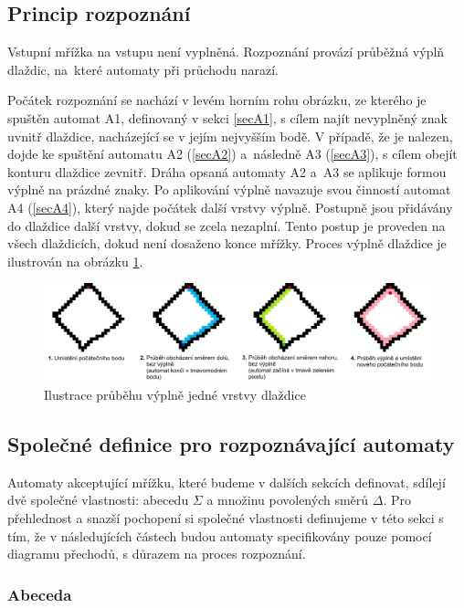\subsection*{Princip rozpoznání}

Vstupní mřížka na vstupu není vyplněná. Rozpoznání provází průběžná výplň dlaždic, na~které automaty při průchodu narazí.

Počátek rozpoznání se nachází v levém horním rohu obrázku, ze kterého je spuštěn automat A1, definovaný v sekci \ref{secA1}, s cílem najít nevyplněný znak uvnitř dlaždice, nacházející se v jejím nejvyšším bodě. V případě, že je nalezen, dojde ke spuštění automatu A2 (\ref{secA2}) a~následně A3 (\ref{secA3}), s cílem obejít konturu dlaždice zevnitř. Dráha opsaná automaty A2 a~A3 se aplikuje formou výplně na prázdné znaky. Po aplikování výplně navazuje svou činností automat A4 (\ref{secA4}), který najde počátek další vrstvy výplně. Postupně jsou přidávány do dlaždice další vrstvy, dokud se zcela nezaplní. Tento postup je proveden na všech dlaždicích, dokud není dosaženo konce mřížky. Proces výplně dlaždice je ilustrován na obrázku \ref{fig:prubehVyplnePOpis}.

\begin{figure}[H]
    \centering
    \includegraphics[width=\textwidth]{obrazky-figures/prubehVyplnePopis.png}
    \caption{Ilustrace průběhu výplně jedné vrstvy dlaždice}
    \label{fig:prubehVyplnePOpis}
\end{figure}

\subsection*{Společné definice pro rozpoznávající automaty}

Automaty akceptující mřížku, které budeme v dalších sekcích definovat, sdílejí dvě společné vlastnosti: abecedu $\Sigma$ a množinu povolených směrů $\Delta$. Pro přehlednost a snazší pochopení si společné vlastnosti definujeme v této sekci s tím, že v následujících částech budou automaty specifikovány pouze pomocí diagramu přechodů, s důrazem na proces rozpoznání.

\subsubsection*{Abeceda}

